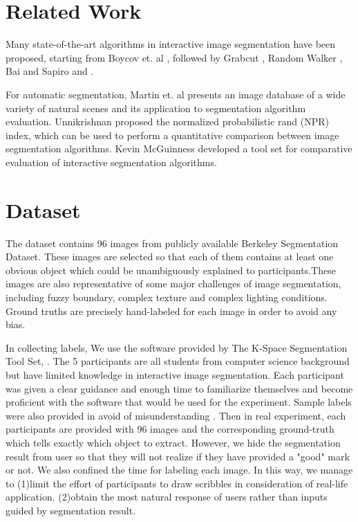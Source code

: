 \documentclass[runningheads,a4paper]{llncs}
\begin{document}
\section{Related Work}

Many state-of-the-art algorithms in interactive image segmentation have been proposed, starting from Boycov et. al \cite{boykov2001interactive}, followed by Grabcut \cite{rother2004grabcut}, Random Walker \cite{grady2006random}, Bai and Sapiro \cite{bai2007geodesic} and \cite{gulshan2010geodesic}.

For automatic segmentation, Martin et. al  \cite{martin2001database} presents an image database of a wide variety of natural scenes and its application to segmentation algorithm evaluation.  Unnikrishnan \cite{unnikrishnan2007toward} proposed the normalized probabilistic rand (NPR) index, which can be used to perform a quantitative comparison between image segmentation algorithms. Kevin McGuinness \cite{mcguinness2010comparative} developed a tool set for comparative evaluation of interactive segmentation algorithms.

\section{Dataset}
The dataset contains 96 images from publicly available Berkeley Segmentation Dataset\cite{martin2001database}. These images are selected so that each of them contains at least one obvious object which could be unambiguously explained to participants.These images are also representative of some major challenges of image segmentation, including fuzzy boundary, complex texture and complex lighting conditions. Ground truths are precisely hand-labeled for each image in order to avoid any bias.

In collecting labels, We use the software provided by The K-Space Segmentation Tool Set, \cite{mcguinness2008k}. The 5 participants are all students from computer science background but have limited knowledge in interactive image segmentation. Each participant was given a clear guidance and enough time to familiarize themselves and become proficient with the software that would be used for the experiment. Sample labels were also provided in avoid of misunderstanding . Then in real experiment, each participants are provided with 96 images and the corresponding ground-truth which tells exactly which object to extract. However, we hide the segmentation result from user so that they will not realize if they have provided a "good" mark or not. We also confined the time for labeling each image. In this way, we manage to (1)limit the effort of participants to draw scribbles in consideration of real-life application.
(2)obtain the most natural response of users rather than inputs guided by segmentation result.
\end{document}
